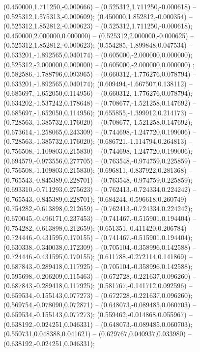  (0.450000,1.711250,-0.000666) -- (0.525312,1.711250,-0.000618) -- (0.525312,1.575313,-0.000609);
 (0.450000,1.852812,-0.000354) -- (0.525312,1.852812,-0.000623) -- (0.525312,1.711250,-0.000618);
 (0.450000,2.000000,0.000000) -- (0.525312,2.000000,-0.000625) -- (0.525312,1.852812,-0.000623);
 (0.554285,-1.899848,0.047534) -- (0.633201,-1.892565,0.040174) -- (0.605000,-2.000000,0.000000);
 (0.525312,-2.000000,0.000000) -- (0.605000,-2.000000,0.000000) ;
 (0.582586,-1.788796,0.093965) -- (0.660312,-1.776276,0.078794) -- (0.633201,-1.892565,0.040174);
 (0.609494,-1.667507,0.138112) -- (0.685697,-1.652050,0.114956) -- (0.660312,-1.776276,0.078794);
 (0.634202,-1.537242,0.178648) -- (0.708677,-1.521258,0.147692) -- (0.685697,-1.652050,0.114956);
 (0.655855,-1.399912,0.214173) -- (0.728563,-1.385732,0.176020) -- (0.708677,-1.521258,0.147692);
 (0.673614,-1.258065,0.243309) -- (0.744698,-1.247720,0.199006) -- (0.728563,-1.385732,0.176020);
 (0.686721,-1.114794,0.264813) -- (0.756508,-1.109803,0.215830) -- (0.744698,-1.247720,0.199006);
 (0.694579,-0.973556,0.277705) -- (0.763548,-0.974759,0.225859) -- (0.756508,-1.109803,0.215830);
 (0.696811,-0.837922,0.281368) -- (0.765543,-0.845389,0.228701) -- (0.763548,-0.974759,0.225859);
 (0.693310,-0.711293,0.275623) -- (0.762413,-0.724334,0.224242) -- (0.765543,-0.845389,0.228701);
 (0.684244,-0.596618,0.260749) -- (0.754282,-0.613898,0.212659) -- (0.762413,-0.724334,0.224242);
 (0.670045,-0.496171,0.237453) -- (0.741467,-0.515901,0.194404) -- (0.754282,-0.613898,0.212659);
 (0.651351,-0.411420,0.206784) -- (0.724446,-0.431595,0.170155) -- (0.741467,-0.515901,0.194404);
 (0.630338,-0.340038,0.172309) -- (0.705104,-0.358996,0.142588) -- (0.724446,-0.431595,0.170155);
 (0.611788,-0.272114,0.141869) -- (0.687843,-0.289418,0.117925) -- (0.705104,-0.358996,0.142588);
 (0.595698,-0.206209,0.115463) -- (0.672728,-0.221637,0.096260) -- (0.687843,-0.289418,0.117925);
 (0.581767,-0.141712,0.092596) -- (0.659534,-0.155143,0.077273) -- (0.672728,-0.221637,0.096260);
 (0.569754,-0.078090,0.072871) -- (0.648073,-0.089485,0.060703) -- (0.659534,-0.155143,0.077273);
 (0.559462,-0.014868,0.055967) -- (0.638192,-0.024251,0.046331) -- (0.648073,-0.089485,0.060703);
 (0.550731,0.048388,0.041621) -- (0.629767,0.040937,0.033980) -- (0.638192,-0.024251,0.046331);
